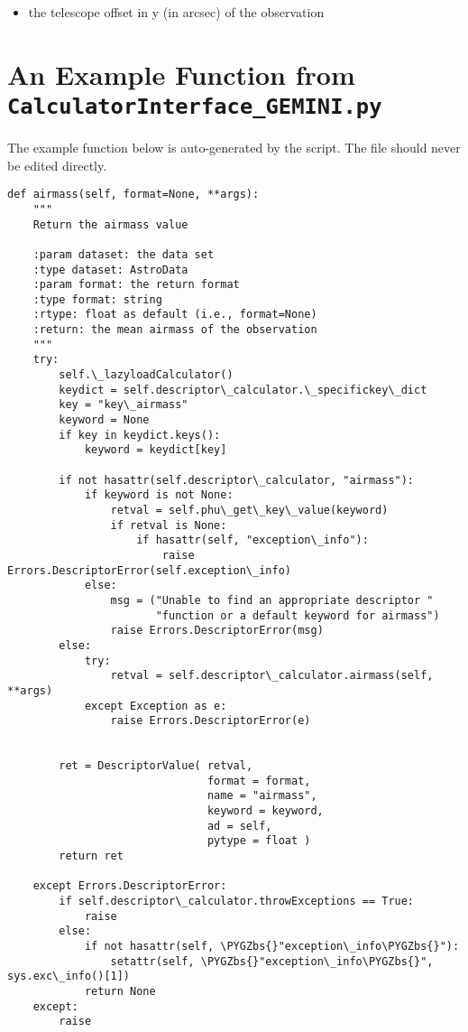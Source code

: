 \documentclass[letterpaper,10pt,english]{sphinxmanual}
\def\PYGZbs{\char`\\}
\begin{document}
\begin{itemize}
\item {} 
the telescope offset in y (in arcsec) of the observation

\end{itemize}


\chapter{An Example Function from \texttt{CalculatorInterface\_GEMINI.py}}
\label{appendices/appendixB:an-example-function-from-calculatorinterface-gemini-py}\label{appendices/appendixB::doc}\label{appendices/appendixB:appendix-ci}
The example function below is auto-generated by the
 script. The  file
should never be edited directly.

\begin{Verbatim}[commandchars=\\\{\}]
def airmass(self, format=None, **args):
    """
    Return the airmass value

    :param dataset: the data set
    :type dataset: AstroData
    :param format: the return format
    :type format: string
    :rtype: float as default (i.e., format=None)
    :return: the mean airmass of the observation
    """
    try:
        self.\_lazyloadCalculator()
        keydict = self.descriptor\_calculator.\_specifickey\_dict
        key = "key\_airmass"
        keyword = None
        if key in keydict.keys():
            keyword = keydict[key]

        if not hasattr(self.descriptor\_calculator, "airmass"):
            if keyword is not None:
                retval = self.phu\_get\_key\_value(keyword)
                if retval is None:
                    if hasattr(self, "exception\_info"):
                        raise Errors.DescriptorError(self.exception\_info)
            else:
                msg = ("Unable to find an appropriate descriptor "
                       "function or a default keyword for airmass")
                raise Errors.DescriptorError(msg)
        else:
            try:
                retval = self.descriptor\_calculator.airmass(self, **args)
            except Exception as e:
                raise Errors.DescriptorError(e)


        ret = DescriptorValue( retval,
                               format = format,
                               name = "airmass",
                               keyword = keyword,
                               ad = self,
                               pytype = float )
        return ret

    except Errors.DescriptorError:
        if self.descriptor\_calculator.throwExceptions == True:
            raise
        else:
            if not hasattr(self, \PYGZbs{}"exception\_info\PYGZbs{}"):
                setattr(self, \PYGZbs{}"exception\_info\PYGZbs{}", sys.exc\_info()[1])
            return None
    except:
        raise
\end{Verbatim}
\end{document}
